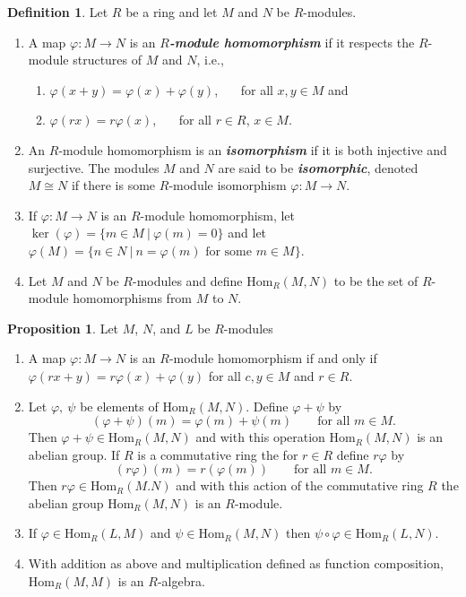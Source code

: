 \documentclass[10pt]{article}
\theoremstyle{definition}
\newtheorem*{prop}{Proposition}
\newtheorem*{defn}{Definition}
\newcommand{\nl}{\vspace{7em}}
\newcommand{\ra}{\rightarrow}
\newcommand{\vphi}{\varphi}
\newcommand{\Hom}{\text{Hom}}
\begin{document}
\begin{defn}
Let $R$ be a ring and let $M$ and $N$ be $R$-modules.
\begin{enumerate}
\item A map $\vphi: M\ra N$ is an $R$\textbf{\textit{-module homomorphism}} if it respects the $R$-module structures of $M$ and $N$, i.e.,
\begin{enumerate}
\item $\vphi(x + y) = \vphi(x) + \vphi(y)$, \ \ \ for all $x,y\in M$ and
\item $\vphi(rx) = r\vphi(x)$, \ \ \ for all $r\in R$, $x\in M$.
\end{enumerate}
\item An $R$-module homomorphism is an \textbf{\textit{isomorphism}} if it is both injective and surjective. The modules $M$ and $N$ are said to be \textbf{\textit{isomorphic}}, denoted $M\cong N$ if there is some $R$-module isomorphism $\vphi: M\ra N$.
\item If $\vphi:M\ra N$ is an $R$-module homomorphism, let $\ker(\vphi) = \{m\in M\ |\ \vphi(m) = 0\}$ and let $\vphi(M) = \{n\in N\ |\ n = \vphi(m)\text{ for some } m\in M\}$.
\item Let $M$ and $N$ be $R$-modules and define $\Hom_R(M,N)$ to be the set of $R$-module homomorphisms from $M$ to $N$.
\end{enumerate}
\end{defn}

\nl

\begin{prop}
Let $M$, $N$, and $L$ be $R$-modules
\begin{enumerate}
\item A map $\vphi: M\ra N$ is an $R$-module homomorphism if and only if $\vphi(rx + y) = r\vphi(x) + \vphi(y)$ for all $c,y\in M$ and $r\in R$.
\item Let $\vphi,\ \psi$ be elements of $\Hom_R(M,N)$. Define $\vphi + \psi $ by
\[(\vphi + \psi)(m) = \vphi(m) + \psi(m)\qquad\text{for all } m\in M.\]
Then $\vphi + \psi\in \Hom_R(M,N)$ and with this operation $\Hom_R(M,N)$ is an abelian group. If $R$ is a commutative ring the for $r\in R$ define $r\vphi$ by 
\[(r\vphi)(m) = r(\vphi(m))\qquad\text{for all } m\in M.\]
Then $r\vphi\in\Hom_R(M.N)$ and with this action of the commutative ring $R$ the abelian group $\Hom_R(M,N)$ is an $R$-module.
\item If $\vphi\in\Hom_R(L,M)$ and $\psi\in\Hom_R(M,N)$ then $\psi\circ\vphi\in\Hom_R(L,N)$.
\item With addition as above and multiplication defined as function composition, $\Hom_R(M,M)$ is an $R$-algebra.
\end{enumerate}
\end{prop}
\end{document}
